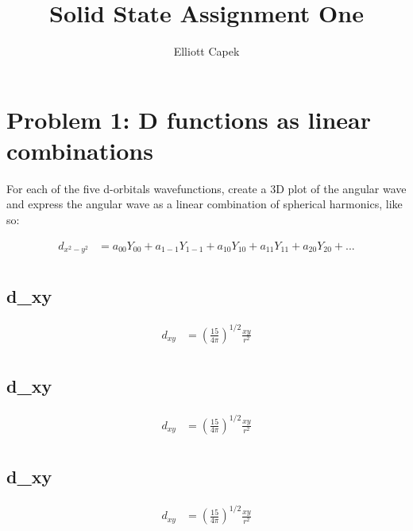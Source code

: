 \documentclass[10pt]{article} %
\title{Solid State Assignment One}
\author{Elliott Capek}
\begin{document}
\maketitle{}

\section{Problem 1: D functions as linear combinations}
For each of the five d-orbitals wavefunctions, create a 3D plot of the angular wave and express
the angular wave as a linear combination of spherical harmonics, like so:

\begin{align*}
  d_{x^2-y^2} &= a_{00}Y_{00} + a_{1-1}Y_{1-1} + a_{10}Y_{10} + a_{11}Y_{11} + a_{20}Y_{20} + ...\\
\end{align*}

\subsection{d_{xy}}
\begin{align*}
  d_{xy} &= \left(\frac{15}{4\pi}\right)^{1/2}\frac{xy}{r^2}\\
\end{align*}


\subsection{d_{xy}}
\begin{align*}
  d_{xy} &= \left(\frac{15}{4\pi}\right)^{1/2}\frac{xy}{r^2}\\
\end{align*}


\subsection{d_{xy}}
\begin{align*}
  d_{xy} &= \left(\frac{15}{4\pi}\right)^{1/2}\frac{xy}{r^2}\\
\end{align*}
\end{document}
